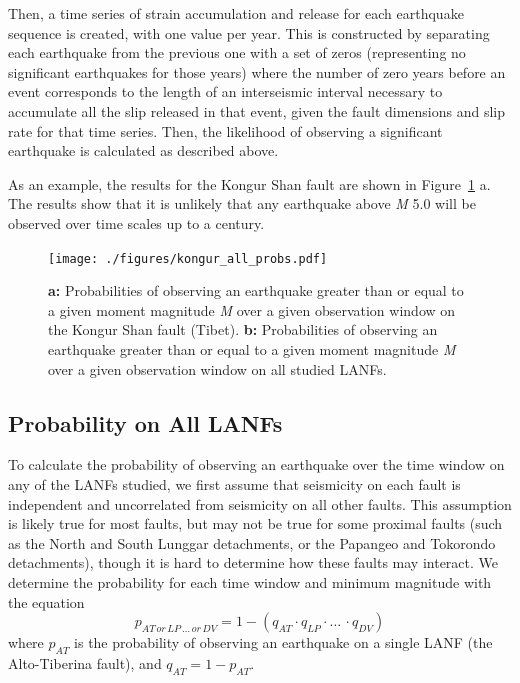 \documentclass[twocolumn,grl]{AGUTeX}
\begin{document}
\begin{article}
Then, a time series of strain accumulation and release for each earthquake sequence is created, with one value per year.  This is constructed by separating each earthquake from the previous one with a set of zeros (representing no significant earthquakes for those years) where the number of zero years before an event corresponds to the length of an interseismic interval necessary to accumulate all the slip released in that event, given the fault dimensions and slip rate for that time series. Then, the likelihood of observing a significant earthquake is calculated as described above.

As an example, the results for the Kongur Shan fault are shown in Figure~\ref{fig:kongur_all_probs} a.  The results show that it is unlikely that any earthquake above \emph{M} 5.0 will be observed over time scales up to a century. 

\begin{figure}[ht!]
\noindent\texttt{[image: ./figures/kongur\_all\_probs.pdf]}
\caption{\textbf{a:} Probabilities of observing an earthquake greater than or equal to a given moment magnitude \emph{M} over a given observation window on the Kongur Shan fault (Tibet). \textbf{b:} Probabilities of observing an earthquake greater than or equal to a given moment magnitude \emph{M} over a given observation window on all studied LANFs. }
\label{fig:kongur_all_probs}
\end{figure}


\subsection{Probability on All LANFs}
To calculate the probability of observing an earthquake over the time window on any of the LANFs studied, we first assume that seismicity on each fault is independent and uncorrelated from seismicity on all other faults. This assumption is likely true for most faults, but may not be true for some proximal faults (such as the North and South Lunggar detachments, or the Papangeo and Tokorondo detachments), though it is hard to determine how these faults may interact.  We determine the probability for each time window and minimum magnitude with the equation
\begin{equation}
p_{AT \, or \, LP\, \ldots \, or \, DV} = 1 - (q_{AT} \cdot q_{LP} \cdot \ldots \, \cdot q_{DV})
\end{equation}
where $p_{AT}$ is the probability of observing an earthquake on a single LANF (the Alto-Tiberina fault), and $q_{AT} = 1 - p_{AT}$.


\end{article}
\end{document}
